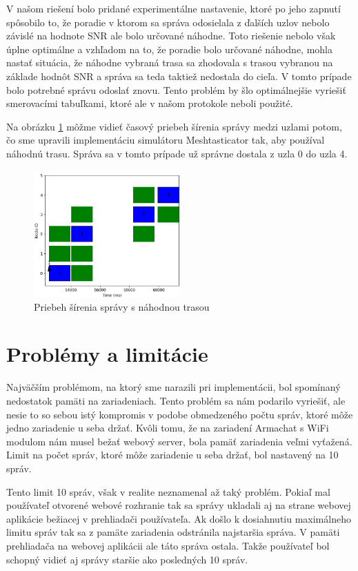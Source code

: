 \documentclass[slovak,master]{diploma}
\begin{document}
V našom riešení bolo pridané experimentálne nastavenie, ktoré po jeho zapnutí spôsobilo to, že poradie v ktorom sa správa odosielala z ďalších uzlov 
nebolo závislé na hodnote SNR ale bolo určované náhodne. Toto riešenie nebolo však úplne optimálne a vzhľadom na to, že poradie bolo určované 
náhodne, mohla nastať situácia, že náhodne vybraná trasa sa zhodovala s trasou vybranou 
na základe hodnôt SNR a správa sa teda taktiež nedostala do cieľa. V tomto prípade bolo potrebné správu odoslať znovu. 
Tento problém by šlo optimálnejšie vyriešiť smerovacími tabuľkami, ktoré ale v našom protokole neboli použité.

Na obrázku \ref{fig:randomizePath} môžme vidieť časový priebeh šírenia správy medzi uzlami potom, čo sme upravili implementáciu simulátoru Meshtasticator tak, 
aby používal náhodnú trasu. Správa sa v tomto prípade už správne dostala z uzla 0 do uzla 4.

\begin{figure}[h!]
  \centering
  \includegraphics[width=0.5\textwidth]{Figures/randomizePath.png}
  \caption{Priebeh šírenia správy s náhodnou trasou}
  \label{fig:randomizePath}
\end{figure}

\section{Problémy a limitácie}
Najväčším problémom, na ktorý sme narazili pri implementácii, bol spomínaný nedostatok pamäti na zariadeniach. Tento problém sa nám podarilo 
vyriešiť, ale nesie to so sebou istý kompromis v podobe obmedzeného počtu správ, ktoré môže jedno zariadenie u seba držať. Kvôli tomu, že na 
zariadení Armachat s WiFi modulom nám musel bežať webový server, bola pamäť zariadenia veľmi vyťažená. Limit na počet správ, ktoré môže zariadenie u seba držať, bol nastavený 
na 10 správ. 

Tento limit 10 správ, však v realite neznamenal až taký problém. Pokiaľ mal používateľ otvorené webové rozhranie tak sa správy ukladali aj na strane webovej aplikácie 
bežiacej v prehliadači používateľa. Ak došlo k dosiahnutiu maximálneho limitu správ tak sa z pamäte zariadenia odstránila najstaršia správa. V pamäti prehliadača na webovej aplikácii 
ale táto správa ostala. Takže používateľ bol schopný vidieť aj správy staršie ako posledných 10 správ.
\end{document}

